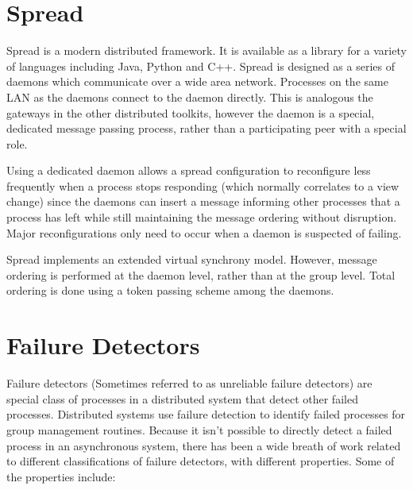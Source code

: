 \section{Spread}

Spread\cite{SPREADTOOLKIT} is a modern distributed framework. It is available as a library for a variety of languages including Java, Python and C++. Spread is designed as a series of daemons which communicate over a wide area network. Processes on the same LAN as the daemons connect to the daemon directly. This is analogous the gateways in the other distributed toolkits, however the daemon is a special, dedicated message passing process, rather than a participating peer with a special role.

Using a dedicated daemon allows a spread configuration to reconfigure less frequently when a process stops responding (which normally correlates to a view change) since the daemons can insert a message informing other processes that a process has left while still maintaining the message ordering without disruption. Major reconfigurations only need to occur when a daemon is suspected of failing.

Spread implements an extended virtual synchrony model. However, message ordering is performed at the daemon level, rather than at the group level. Total ordering is done using a token passing scheme among the daemons.

\section{Failure Detectors}

Failure detectors \cite{FAILUREDETECTORS} (Sometimes referred to as unreliable failure detectors) are special class of processes in a distributed system that detect other failed processes. Distributed systems use failure detection to identify failed processes for group management routines. Because it isn't possible to directly detect a failed process in an asynchronous system, there has been a wide breath of work related to different classifications of failure detectors, with different properties. Some of the properties include\cite{FAILUREDETECTORS}:

